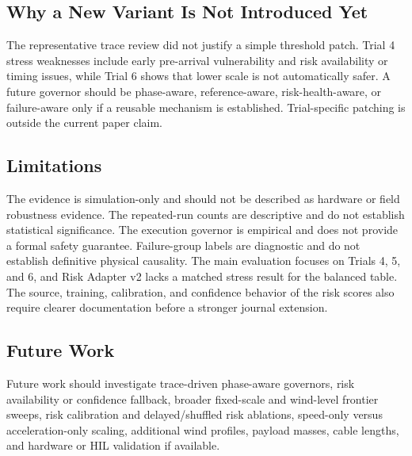 \subsection{Why a New Variant Is Not Introduced Yet}

The representative trace review did not justify a simple threshold patch.
Trial 4 stress weaknesses include early pre-arrival vulnerability and risk
availability or timing issues, while Trial 6 shows that lower scale is not
automatically safer. A future governor should be phase-aware, reference-aware,
risk-health-aware, or failure-aware only if a reusable mechanism is established.
Trial-specific patching is outside the current paper claim.

\subsection{Limitations}

The evidence is simulation-only and should not be described as hardware or
field robustness evidence. The repeated-run counts are descriptive and do not
establish statistical significance. The execution governor is empirical and
does not provide a formal safety guarantee. Failure-group labels are diagnostic
and do not establish definitive physical causality. The main evaluation focuses
on Trials 4, 5, and 6, and Risk Adapter v2 lacks a matched stress result for
the balanced table. The source, training, calibration, and confidence behavior
of the risk scores also require clearer documentation before a stronger journal
extension.

\subsection{Future Work}

Future work should investigate trace-driven phase-aware governors, risk
availability or confidence fallback, broader fixed-scale and wind-level
frontier sweeps, risk calibration and delayed/shuffled risk ablations,
speed-only versus acceleration-only scaling, additional wind profiles, payload
masses, cable lengths, and hardware or HIL validation if available.
